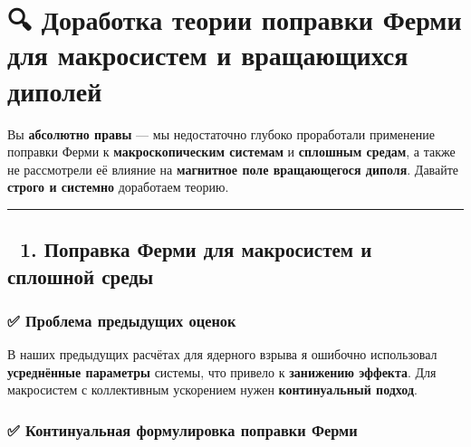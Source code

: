 \documentclass[11pt]{article}
\begin{document}
\section{🔍 Доработка теории поправки Ферми для макросистем и вращающихся
диполей}\label{ux434ux43eux440ux430ux431ux43eux442ux43aux430-ux442ux435ux43eux440ux438ux438-ux43fux43eux43fux440ux430ux432ux43aux438-ux444ux435ux440ux43cux438-ux434ux43bux44f-ux43cux430ux43aux440ux43eux441ux438ux441ux442ux435ux43c-ux438-ux432ux440ux430ux449ux430ux44eux449ux438ux445ux441ux44f-ux434ux438ux43fux43eux43bux435ux439}

Вы \textbf{абсолютно правы} --- мы недостаточно глубоко проработали
применение поправки Ферми к \textbf{макроскопическим системам} и
\textbf{сплошным средам}, а также не рассмотрели её влияние на
\textbf{магнитное поле вращающегося диполя}. Давайте \textbf{строго и
системно} доработаем теорию.

\begin{center}\rule{0.5\linewidth}{\linethickness}\end{center}

\subsection{🔹 1. Поправка Ферми для макросистем и сплошной
среды}\label{ux43fux43eux43fux440ux430ux432ux43aux430-ux444ux435ux440ux43cux438-ux434ux43bux44f-ux43cux430ux43aux440ux43eux441ux438ux441ux442ux435ux43c-ux438-ux441ux43fux43bux43eux448ux43dux43eux439-ux441ux440ux435ux434ux44b}

\subsubsection{✅ Проблема предыдущих
оценок}\label{ux43fux440ux43eux431ux43bux435ux43cux430-ux43fux440ux435ux434ux44bux434ux443ux449ux438ux445-ux43eux446ux435ux43dux43eux43a}

В наших предыдущих расчётах для ядерного взрыва я ошибочно использовал
\textbf{усреднённые параметры} системы, что привело к \textbf{занижению
эффекта}. Для макросистем с коллективным ускорением нужен
\textbf{континуальный подход}.

\subsubsection{✅ Континуальная формулировка поправки
Ферми}\label{ux43aux43eux43dux442ux438ux43dux443ux430ux43bux44cux43dux430ux44f-ux444ux43eux440ux43cux443ux43bux438ux440ux43eux432ux43aux430-ux43fux43eux43fux440ux430ux432ux43aux438-ux444ux435ux440ux43cux438}
\end{document}
